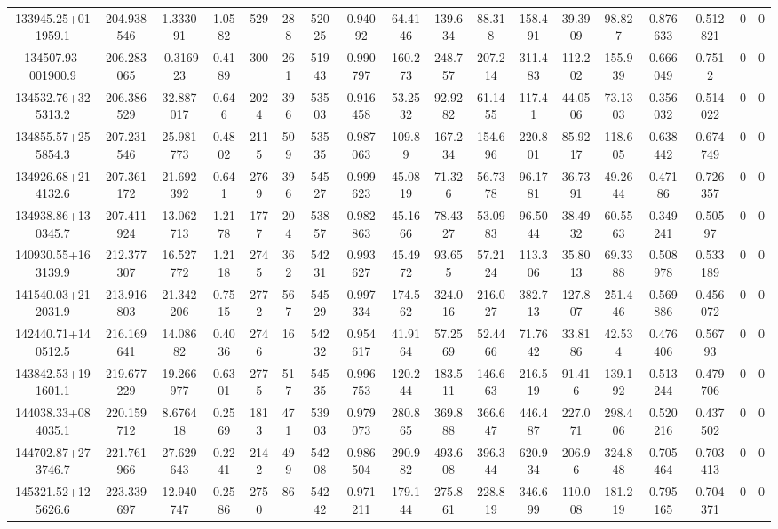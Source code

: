 \begin{table}
\begin{tabular}{cccccccccccccccccc}
133945.25+011959.1 & 204.938546 & 1.333091 & 1.0582 & 529 & 288 & 52025 & 0.94092 & 64.4146 & 139.634 & 88.318 & 158.491 & 39.3909 & 98.827 & 0.876633 & 0.512821 & 0 & 0 \\
134507.93-001900.9 & 206.283065 & -0.316923 & 0.4189 & 300 & 261 & 51943 & 0.990797 & 160.273 & 248.757 & 207.214 & 311.483 & 112.202 & 155.939 & 0.666049 & 0.7512 & 0 & 0 \\
134532.76+325313.2 & 206.386529 & 32.887017 & 0.646 & 2024 & 396 & 53503 & 0.916458 & 53.2532 & 92.9282 & 61.1455 & 117.41 & 44.0506 & 73.1303 & 0.356032 & 0.514022 & 0 & 0 \\
134855.57+255854.3 & 207.231546 & 25.981773 & 0.4802 & 2115 & 509 & 53535 & 0.987063 & 109.89 & 167.234 & 154.696 & 220.801 & 85.9217 & 118.605 & 0.638442 & 0.674749 & 0 & 0 \\
134926.68+214132.6 & 207.361172 & 21.692392 & 0.641 & 2769 & 396 & 54527 & 0.999623 & 45.0819 & 71.326 & 56.7378 & 96.1781 & 36.7391 & 49.2644 & 0.47186 & 0.726357 & 0 & 0 \\
134938.86+130345.7 & 207.411924 & 13.062713 & 1.2178 & 1777 & 204 & 53857 & 0.982863 & 45.1666 & 78.4327 & 53.0983 & 96.5044 & 38.4932 & 60.5563 & 0.349241 & 0.50597 & 0 & 0 \\
140930.55+163139.9 & 212.377307 & 16.527772 & 1.2118 & 2745 & 362 & 54231 & 0.993627 & 45.4972 & 93.655 & 57.2124 & 113.306 & 35.8013 & 69.3388 & 0.508978 & 0.533189 & 0 & 0 \\
141540.03+212031.9 & 213.916803 & 21.342206 & 0.7515 & 2772 & 567 & 54529 & 0.997334 & 174.562 & 324.016 & 216.027 & 382.713 & 127.807 & 251.446 & 0.569886 & 0.456072 & 0 & 0 \\
142440.71+140512.5 & 216.169641 & 14.08682 & 0.4036 & 2746 & 16 & 54232 & 0.954617 & 41.9164 & 57.2569 & 52.4466 & 71.7642 & 33.8186 & 42.534 & 0.476406 & 0.56793 & 0 & 0 \\
143842.53+191601.1 & 219.677229 & 19.266977 & 0.6301 & 2775 & 517 & 54535 & 0.996753 & 120.244 & 183.511 & 146.663 & 216.519 & 91.416 & 139.192 & 0.513244 & 0.479706 & 0 & 0 \\
144038.33+084035.1 & 220.159712 & 8.676418 & 0.2569 & 1813 & 471 & 53903 & 0.979073 & 280.865 & 369.888 & 366.647 & 446.487 & 227.071 & 298.406 & 0.520216 & 0.437502 & 0 & 0 \\
144702.87+273746.7 & 221.761966 & 27.629643 & 0.2241 & 2142 & 499 & 54208 & 0.986504 & 290.982 & 493.608 & 396.344 & 620.934 & 206.96 & 324.848 & 0.705464 & 0.703413 & 0 & 0 \\
145321.52+125626.6 & 223.339697 & 12.940747 & 0.2586 & 2750 & 86 & 54242 & 0.971211 & 179.144 & 275.861 & 228.819 & 346.699 & 110.008 & 181.219 & 0.795165 & 0.704371 & 0 & 0 \\

\end{tabular}
\end{table}
